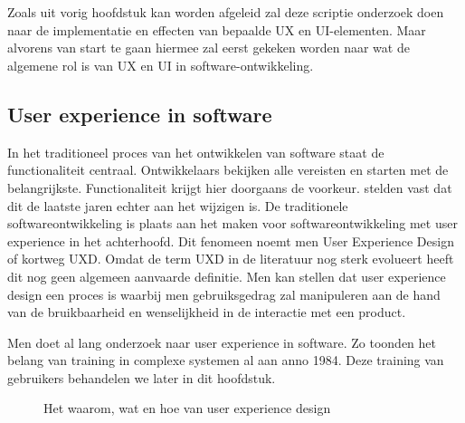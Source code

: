 \chapter{}
\label{ch:stand-van-zaken}


Zoals uit vorig hoofdstuk kan worden afgeleid zal deze scriptie onderzoek doen naar de implementatie en effecten van bepaalde UX en UI-elementen. Maar alvorens van start te gaan hiermee zal eerst gekeken worden naar wat de algemene rol is van UX en UI in software-ontwikkeling.

\section{User experience in software}
\label{sec:user-experience-in-software}

In het traditioneel proces van het ontwikkelen van software staat de functionaliteit centraal. Ontwikkelaars bekijken alle vereisten en starten met de belangrijkste. Functionaliteit krijgt hier doorgaans de voorkeur. \textcite{Harutyunyan2019} stelden vast dat dit de laatste jaren echter aan het wijzigen is. De traditionele softwareontwikkeling is plaats aan het maken voor softwareontwikkeling met user experience in het achterhoofd. Dit fenomeen noemt men User Experience Design of kortweg UXD. Omdat de term UXD in de literatuur nog sterk evolueert heeft dit nog geen algemeen aanvaarde definitie. Men kan stellen dat user experience design een proces is waarbij men gebruiksgedrag zal manipuleren aan de hand van de bruikbaarheid en wenselijkheid in de interactie met een product. 

Men doet al lang onderzoek naar user experience in software. Zo toonden \textcite{Carroll1984} het belang van training in complexe systemen al aan anno 1984. Deze training van gebruikers behandelen we later in dit hoofdstuk.

\begin{figure}[h]
    \centering
    \def\svgwidth{.8\columnwidth}
    
    \caption{Het waarom, wat en hoe van user experience design}
    \label{fig:ux-waarom-wat-hoe}
\end{figure}

